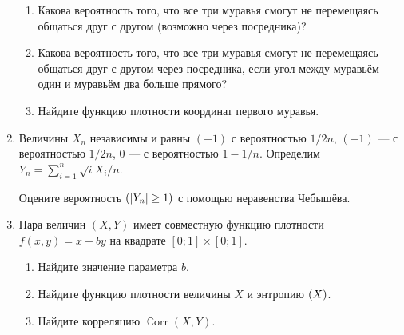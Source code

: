 \documentclass[12pt]{article}
\DeclareMathOperator{\Corr}{\mathbb{C}orr}
\let\P\relax
\DeclareMathOperator{\P}{\mathbb{P}}
\DeclarePairedDelimiter{\abs}{\lvert}{\rvert}
\let\H\relax
\DeclareMathOperator{\H}{\mathbb{H}}
\begin{document}
\begin{enumerate}
\begin{enumerate}
    \item Какова вероятность того, что все три муравья смогут не перемещаясь общаться друг с другом (возможно
    через посредника)?
    \item Какова вероятность того, что все три муравья смогут не перемещаясь общаться друг с другом через посредника, 
    если угол между муравьём один и муравьём два больше прямого?
    \item Найдите функцию плотности координат первого муравья. 
\end{enumerate}
    \item %
    Величины $X_n$ независимы и равны $(+1)$ с вероятностью $1/2n$, $(-1)$ — с вероятностью $1/2n$, $0$ — с вероятностью $1-1/n$.
    Определим $Y_n = \sum_{i=1}^n \sqrt{i} X_i / n$.

    Оцените вероятность $\P(\abs{Y_n} \geq 1)$ с помощью неравенства Чебышёва.

    \item %
    Пара величин $(X, Y)$ имеет совместную функцию плотности $f(x, y) = x + by$ на квадрате $[0;1]\times[0;1]$.
    \begin{enumerate}
        \item Найдите значение параметра $b$. 
        \item Найдите функцию плотности величины $X$ и энтропию $\H(X)$.
        \item Найдите корреляцию $\Corr(X, Y)$.
    \end{enumerate}

\end{enumerate}
\end{document}
